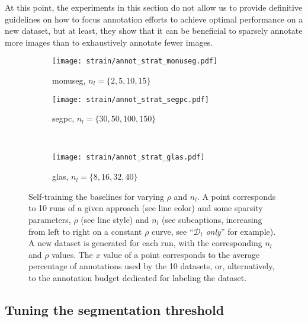 At this point, the experiments in this section do not allow us to provide definitive guidelines on how to focus annotation efforts to achieve optimal performance on a new dataset, but at least, they show  that it can be beneficial to sparsely annotate more images than to exhaustively annotate fewer images.

\begin{figure}[t]
  \centering
  \begin{subfigure}{0.48\textwidth}
    \centering
    \texttt{[image: strain/annot\_strat\_monuseg.pdf]}
    \caption{\acrshort{monuseg}, $n_l = \{2, 5, 10, 15\}$ }
    \label{fig:strain:annot_strat_monuseg}
  \end{subfigure}
  \begin{subfigure}{0.48\textwidth}
    \centering
    \texttt{[image: strain/annot\_strat\_segpc.pdf]}
    \caption{\acrshort{segpc}, $n_l = \{30, 50, 100, 150\}$ }
    \label{fig:strain:annot_strat_segpc}
  \end{subfigure} \\
  \begin{subfigure}{0.48\textwidth}
    \centering
    \texttt{[image: strain/annot\_strat\_glas.pdf]}
    \caption{\acrshort{glas}, $n_l = \{8, 16, 32, 40\}$ }
    \label{fig:strain:annot_strat_glas}
  \end{subfigure}
  \caption{Self-training \vs the baselines for varying $\rho$ and $n_l$. A point corresponds to 10 runs of a given approach (see line color) and some sparsity parameters, $\rho$ (see line style) and $n_l$ (see subcaptions, increasing from left to right on a constant $\rho$ curve, see ``\textit{$\mathcal{D}_l$ only}'' for example). A new dataset is generated for each run, with the corresponding $n_l$ and $\rho$ values. The $x$ value of a point corresponds to the average percentage of annotations used by the 10 datasets, or, alternatively, to the annotation budget dedicated for labeling the dataset.}
  \label{fig:strain:annot_strat}
\end{figure}

\subsection{Tuning the segmentation threshold}
\label{sec:straing:manualtuning}

